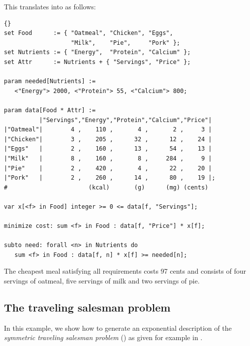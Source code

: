 \noindent This translates into \zimpl as follows:

\medskip
{}
\begin{lstlisting}[frame=tb]{}
set Food      := { "Oatmeal", "Chicken", "Eggs",
                   "Milk",    "Pie",     "Pork" };
set Nutrients := { "Energy",  "Protein", "Calcium" };
set Attr      := Nutrients + { "Servings", "Price" };

param needed[Nutrients] :=
   <"Energy"> 2000, <"Protein"> 55, <"Calcium"> 800;

param data[Food * Attr] :=
          |"Servings","Energy","Protein","Calcium","Price"|
|"Oatmeal"|        4 ,    110 ,       4 ,       2 ,     3 |
|"Chicken"|        3 ,    205 ,      32 ,      12 ,    24 |
|"Eggs"   |        2 ,    160 ,      13 ,      54 ,    13 |
|"Milk"   |        8 ,    160 ,       8 ,     284 ,     9 |
|"Pie"    |        2 ,    420 ,       4 ,      22 ,    20 |
|"Pork"   |        2 ,    260 ,      14 ,      80 ,    19 |;
#                       (kcal)       (g)      (mg) (cents)

var x[<f> in Food] integer >= 0 <= data[f, "Servings"];

minimize cost: sum <f> in Food : data[f, "Price"] * x[f];

subto need: forall <n> in Nutrients do
   sum <f> in Food : data[f, n] * x[f] >= needed[n];
\end{lstlisting}

\medskip
\noindent The cheapest meal satisfying all requirements costs 97 cents and
consists of four servings of oatmeal, five servings of milk and two
servings of pie.


\subsection{The traveling salesman problem}
In this example, we show how to generate an exponential
description of the \emph{symmetric traveling salesman problem} (\tsp)
as given for example in
\cite[Section 58.5]{Schrijver2003}.

